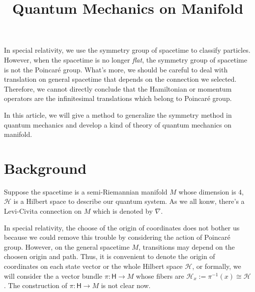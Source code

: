 \documentclass[14pt]{extarticle}
\title{Quantum Mechanics on Manifold}
\begin{document}
\maketitle

In special relativity, we use the symmetry group of spacetime to classify particles. However, when the spacetime is no longer \textit{flat}, the symmetry group of spacetime is not the Poincar\'e group. What's more, we should be careful to deal with translation on general spacetime that depends on the connection we selected. Therefore, we cannot directly conclude that the Hamiltonian or momentum operators are the infinitesimal translations which belong to Poincar\'e group.

In this article, we will give a method to generalize the symmetry method in quantum mechanics and develop a kind of theory of quantum mechanics on manifold.

\section{Background}

Suppose the spacetime is a semi-Riemannian manifold $M$ whose dimension is $4$, $\mathcal H$ is a Hilbert space to describe our quantum system. As we all konw, there's a Levi-Civita connection on $M$ which is denoted by $\nabla$.

In special relativity, the choose of the origin of coordinates does not bother us because we could remove this trouble by considering the action of Poincar\'e group. However, on the general spacetime $M$, transitions may depend on the choosen origin and path. Thus, it is convenient to denote  the origin of coordinates on each state vector or the whole Hilbert space $\mathcal H$, or formally, we will consider the a vector bundle $\pi:\mathsf H\to M$ whose fibers are $\mathcal H_x:=\pi^{-1}(x)\cong \mathcal H$. The construction of $\pi:\mathsf H\to M$ is not clear now.
\end{document}
